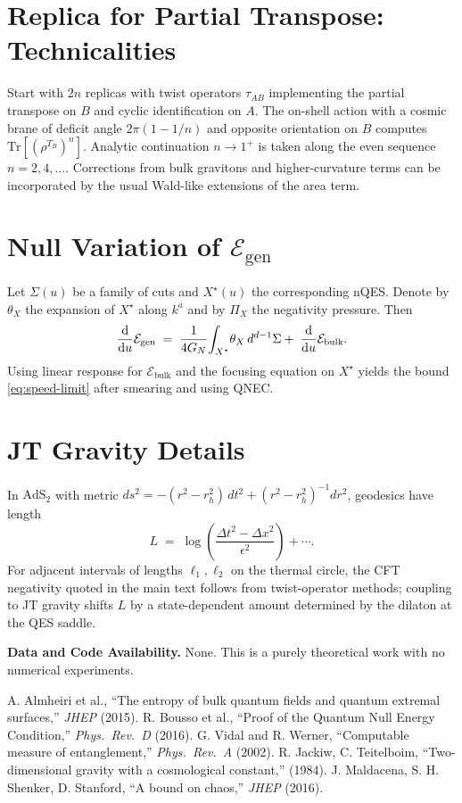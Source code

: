 \documentclass[11pt]{article}
\newcommand{\E}{\mathcal{E}}
\newcommand{\Tr}{\mathrm{Tr}}
\begin{document}
\appendix

\section{Replica for Partial Transpose: Technicalities}
Start with $2n$ replicas with twist operators $\tau_{AB}$ implementing the partial transpose on $B$ and cyclic identification on $A$.
The on-shell action with a cosmic brane of deficit angle $2\pi(1-1/n)$ and opposite orientation on $B$ computes $\Tr[(\rho^{T_B})^{n}]$.
Analytic continuation $n\rightarrow 1^+$ is taken along the even sequence $n=2,4,\dots$.
Corrections from bulk gravitons and higher-curvature terms can be incorporated by the usual Wald-like extensions of the area term.

\section{Null Variation of $\E_{\mathrm{gen}}$}
Let $\Sigma(u)$ be a family of cuts and $X^\star(u)$ the corresponding nQES.
Denote by $\theta_X$ the expansion of $X^\star$ along $k^a$ and by $\Pi_X$ the negativity pressure. Then
\begin{equation}
  \dv{u}\E_{\mathrm{gen}} \;=\; \frac{1}{4G_N}\!\int_{X^\star}\!\theta_X\, d^{d-1}\Sigma +\; \dv{u}\E_{\mathrm{bulk}}.
\end{equation}
Using linear response for $\E_{\mathrm{bulk}}$ and the focusing equation on $X^\star$ yields the bound \eqref{eq:speed-limit} after smearing and using QNEC.

\section{JT Gravity Details}
In $\mathrm{AdS}_2$ with metric $ds^2=-(r^2-r_h^2)\,dt^2+(r^2-r_h^2)^{-1}dr^2$, geodesics have length
\begin{equation}
  L \;=\; \log\!\left(\frac{\Delta t^2 - \Delta x^2}{\epsilon^2}\right) + \cdots.
\end{equation}
For adjacent intervals of lengths $\ell_1,\ell_2$ on the thermal circle, the CFT negativity quoted in the main text follows from twist-operator methods; coupling to JT gravity shifts $L$ by a state-dependent amount determined by the dilaton at the QES saddle.
\medskip

\noindent\textbf{Data and Code Availability.} None. This is a purely theoretical work with no numerical experiments.

\begin{thebibliography}{9}
A. Almheiri et al., ``The entropy of bulk quantum fields and quantum extremal surfaces,'' \emph{JHEP} (2015).
R. Bousso et al., ``Proof of the Quantum Null Energy Condition,'' \emph{Phys.\ Rev.\ D} (2016).
G. Vidal and R. Werner, ``Computable measure of entanglement,'' \emph{Phys.\ Rev.\ A} (2002).
R. Jackiw, C. Teitelboim, ``Two-dimensional gravity with a cosmological constant,'' (1984).
J. Maldacena, S. H. Shenker, D. Stanford, ``A bound on chaos,'' \emph{JHEP} (2016).
\end{thebibliography}
\end{document}
